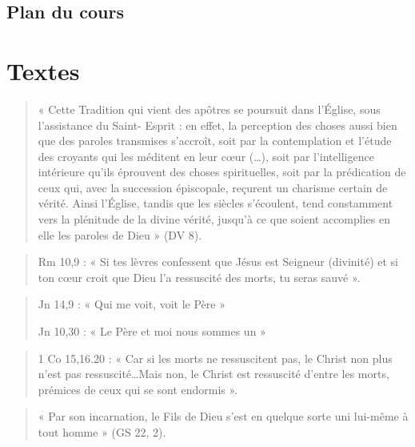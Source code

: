   
    
    \subsection{Plan du cours}
    
  



\section{Textes} 


\begin{quote}
    « Cette Tradition qui vient des apôtres se poursuit dans l'Église, sous
l'assistance du Saint- Esprit : en effet, la perception des choses aussi
bien que des paroles transmises s'accroît, soit par la contemplation et
l'étude des croyants qui les méditent en leur cœur (\ldots), soit par
l'intelligence intérieure qu'ils éprouvent des choses spirituelles, soit
par la prédication de ceux qui, avec la succession épiscopale, reçurent
un charisme certain de vérité. Ainsi l'Église, tandis que les siècles
s'écoulent, tend constamment vers la plénitude de la divine vérité,
jusqu'à ce que soient accomplies en elle les paroles de Dieu » (DV 8).
\end{quote}

\begin{quote}
    Rm 10,9 : « Si tes lèvres confessent que Jésus est Seigneur (divinité)
et si ton cœur croit que Dieu l'a ressuscité des morts, tu seras sauvé
».
\end{quote}

\begin{quote}
    Jn 14,9 : « Qui me voit, voit le Père »

Jn 10,30 : « Le Père et moi nous sommes un »
\end{quote}



\begin{quote}
    1 Co 15,16.20 : « Car si les morts ne ressuscitent pas, le Christ non
plus n'est pas ressuscité\ldots Mais non, le Christ est ressuscité
d'entre les morts, prémices de ceux qui se sont endormis ».
\end{quote}

\begin{quote}
    « Par son incarnation, le Fils de Dieu s'est en quelque sorte uni
lui-même à tout homme » (GS 22, 2).
\end{quote}

